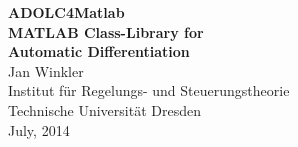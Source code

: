 \documentclass[11pt,twoside]{article}
\begin{document}
\begin{titlepage}
\vspace*{2cm}
{ \normalsize
{\bf \huge ADOLC4Matlab}\\[8 ex]
{\bf \Large MATLAB Class-Library for \\ Automatic Differentiation}\\[20 ex]
{\Large Jan Winkler}\\[3 ex]
{\Large Institut für Regelungs- und Steuerungstheorie}\\[3ex]
{\Large Technische Universität Dresden}\\[3ex]
{\Large July, 2014}}
\end{titlepage} 


\pagestyle{plain}   
\tableofcontents
      
\pagestyle{headings}




\end{document}
